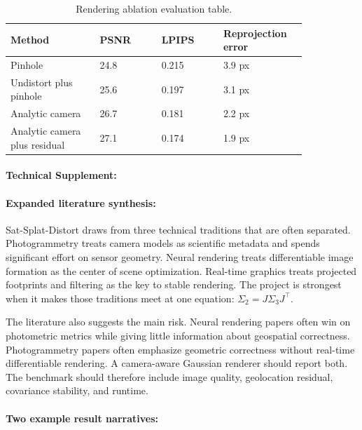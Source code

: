 \documentclass{article}
\begin{document}
\begin{table}[t]
\centering
\caption{Rendering ablation evaluation table.}
\begin{tabular}{@{}p{0.26\linewidth}p{0.18\linewidth}p{0.18\linewidth}p{0.22\linewidth}@{}}
\toprule
\textbf{Method} & \textbf{PSNR} & \textbf{LPIPS} & \textbf{Reprojection error}\\
\midrule
Pinhole & 24.8 & 0.215 & 3.9 px\\
Undistort plus pinhole & 25.6 & 0.197 & 3.1 px\\
Analytic camera & 26.7 & 0.181 & 2.2 px\\
Analytic camera plus residual & 27.1 & 0.174 & 1.9 px\\
\bottomrule
\end{tabular}
\end{table}

\paragraph{Technical Supplement:}

\paragraph{Expanded literature synthesis:}

Sat-Splat-Distort draws from three technical traditions that are often separated. Photogrammetry treats camera models as scientific metadata and spends significant effort on sensor geometry. Neural rendering treats differentiable image formation as the center of scene optimization. Real-time graphics treats projected footprints and filtering as the key to stable rendering. The project is strongest when it makes those traditions meet at one equation: $\Sigma_2=J\Sigma_3J^\top$.

The literature also suggests the main risk. Neural rendering papers often win on photometric metrics while giving little information about geospatial correctness. Photogrammetry papers often emphasize geometric correctness without real-time differentiable rendering. A camera-aware Gaussian renderer should report both. The benchmark should therefore include image quality, geolocation residual, covariance stability, and runtime.

\paragraph{Two example result narratives:}
\end{document}
